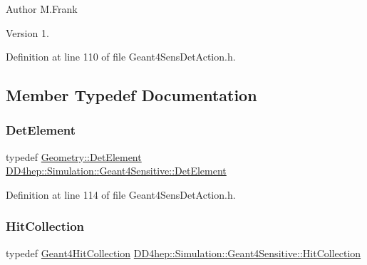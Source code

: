 \begin{DoxyAuthor}{Author}
M.\+Frank 
\end{DoxyAuthor}
\begin{DoxyVersion}{Version}
1. 
\end{DoxyVersion}


Definition at line 110 of file Geant4\+Sens\+Det\+Action.\+h.



\subsection{Member Typedef Documentation}
\hypertarget{class_d_d4hep_1_1_simulation_1_1_geant4_sensitive_a1cb1af5fb1194be1e1c1137f1e54272b}{}\label{class_d_d4hep_1_1_simulation_1_1_geant4_sensitive_a1cb1af5fb1194be1e1c1137f1e54272b} 
\subsubsection{\texorpdfstring{Det\+Element}{DetElement}}
{\footnotesize\ttfamily typedef \hyperlink{class_d_d4hep_1_1_geometry_1_1_det_element}{Geometry\+::\+Det\+Element} \hyperlink{class_d_d4hep_1_1_simulation_1_1_geant4_sensitive_a1cb1af5fb1194be1e1c1137f1e54272b}{D\+D4hep\+::\+Simulation\+::\+Geant4\+Sensitive\+::\+Det\+Element}}



Definition at line 114 of file Geant4\+Sens\+Det\+Action.\+h.

\hypertarget{class_d_d4hep_1_1_simulation_1_1_geant4_sensitive_a160ee45c4477c7165b1d56d377e5582f}{}\label{class_d_d4hep_1_1_simulation_1_1_geant4_sensitive_a160ee45c4477c7165b1d56d377e5582f} 
\subsubsection{\texorpdfstring{Hit\+Collection}{HitCollection}}
{\footnotesize\ttfamily typedef \hyperlink{class_d_d4hep_1_1_simulation_1_1_geant4_hit_collection}{Geant4\+Hit\+Collection} \hyperlink{class_d_d4hep_1_1_simulation_1_1_geant4_sensitive_a160ee45c4477c7165b1d56d377e5582f}{D\+D4hep\+::\+Simulation\+::\+Geant4\+Sensitive\+::\+Hit\+Collection}}



